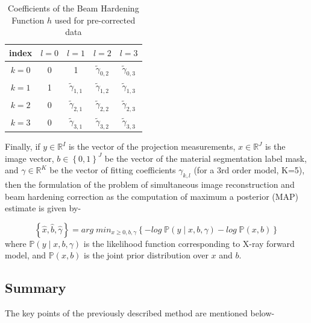 \begin{table}[]
\centering
 \begin{tabular}{|c|c|c|c|c|} 
 \hline
  index & $l=0$ & $$l=1$$ & $$l=2$$ & $l=3$ \\ \hline
 $k=0$ & 0  & 1 & $\widetilde\gamma_{0,2}$ & $\widetilde\gamma_{0,3}$\\  \hline
 $k=1$ & 1  & $\widetilde\gamma_{1,1}$ & $\widetilde\gamma_{1,2}$ & $\widetilde\gamma_{1,3}$\\ \hline
 $k=2$ & 0  & $\widetilde\gamma_{2,1}$ & $\widetilde\gamma_{2,2}$ & $\widetilde\gamma_{2,3}$\\  \hline
 $k=3$ & 0  & $\widetilde\gamma_{3,1}$ & $\widetilde\gamma_{3,2}$ & $\widetilde\gamma_{3,3}$\\  \hline
 
\end{tabular}
\caption{Coefficients of the Beam Hardening Function $h$ used for pre-corrected data}
\label{table2}
\end{table} 

Finally, if $y \in \mathbb{R}^I$ is the vector of the projection measurements, $x \in \mathbb{R}^J$ is the image vector, $b \in {\left\lbrace 0 , 1 \right\rbrace}^J $ be the vector of the material segmentation label mask, and $\gamma \in \mathbb{R}^K$ be the vector of fitting coefficients $\gamma_{k,l}$ (for a 3rd order model, K=5), then the formulation of the problem of simultaneous image reconstruction and beam hardening correction as the computation of maximum a posterior (MAP) estimate is given by-

\begin{equation}
\label{eq39}
\left\lbrace  \widehat{x} , \widehat{b} , \widehat{\gamma} \right\rbrace =  arg \; min_{x \geq 0, b,\gamma} \left\lbrace - log \; \mathbb{P} (y \mid x,b,\gamma) - log \; \mathbb{P} (x,b) \right\rbrace
\end{equation} where $\mathbb{P} (y \mid x,b,\gamma)$ is the likelihood function corresponding to X-ray forward model, and $\mathbb{P} (x,b)$ is the joint prior distribution over $x$ and $b$.

\subsection{Summary}

The key points of the previously described method are mentioned below-

